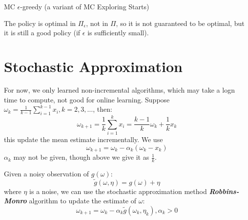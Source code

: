 \documentclass[10pt]{elegantbook}
\newcommand{\mydefination}[1]{\textbf{\textit{\textcolor{structurecolor}{#1}}}}
\begin{document}
\begin{algorithm}[H]
\caption{MC $\epsilon$-greedy (a variant of MC Exploring Starts)}
\KwIn{Initial policy $\pi_0(a|s)$, $Q(s,a)$, $\text{Returns}(s,a)=0$, $\text{Num}(s,a)=0, \forall (s,a). \epsilon \in (0, 1]$}

\end{algorithm}

\vspace{\baselineskip}

The policy is optimal in $\Pi_{\epsilon}$, not in $\Pi$, so it is not guaranteed to be optimal, but it is still a good policy (if $\epsilon$ is sufficiently small).


\section{Stochastic Approximation}
For now, we only learned non-incremental algorithms, which may take a logn time to compute, not good for online learning.
Suppose $\omega_{k} = \frac{1}{k-1} \sum_{i=1}^{k-1} x_i, k = 2, 3, \ldots$, then:
\[ \omega_{k+1} = \frac{1}{k} \sum_{i=1}^{k} x_i = \frac{k-1}{k} \omega_k + \frac{1}{k} x_k \]
this update the mean estimate incrementally. We use 
\begin{equation}
    \omega_{k+1} = \omega_{k} - \alpha_k (\omega_{k} - x_k)
\end{equation}
$\alpha_k$ may not be given, though 
above we give it as $\frac{1}{k}$.

Given a noisy observation of $g(\omega)$:
\[ \tilde{g}(\omega, \eta) = g(\omega) + \eta \]
where $\eta$ is a noise, we can use the stochastic approximation method \mydefination{Robbins-Monro} algorithm to update the estimate of $\omega$:
\begin{equation}
    \omega_{k+1} = \omega_k - \alpha_k \tilde{g}(\omega_k, \eta_k), \alpha_k > 0
\end{equation}
\end{document}
